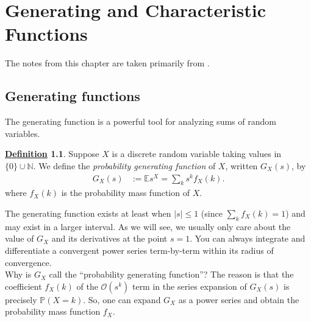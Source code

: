 \documentclass[12pt]{book}
\let\varepsilon\epsilon
\numberwithin{equation}{chapter}
\theoremstyle{plain}
\numberwithin{theorem}{section}
\theoremstyle{definition}
\newtheorem{definition}[theorem]{\underline{Definition}}
\numberwithin{exercise}{chapter}
\newcommand{\<}{\langle}
\renewcommand{\>}{\rangle}
\renewcommand{\(}{\left(}
\renewcommand{\)}{\right)}
\renewcommand{\[}{\left[}
\renewcommand{\]}{\right]}
\newcommand\Eb{\mathds{E}}
\newcommand\Pb{\mathds{P}}
\newcommand\Nb{\mathds{N}}
\newcommand\Oc{\mathscr{O}}
\newcommand\eps{\varepsilon}
\newcommand\dd{\mathrm{d}}
\begin{document}

%
%

\chapter{Generating and Characteristic Functions}
\label{chapter:generating}
The notes from this chapter are taken primarily from \cite[Chapter 5]{gs2001}.


\section{Generating functions}

The generating function is a powerful tool for analyzing sums of random variables.

\begin{definition}
Suppose $X$ is a discrete random variable taking values in $\{0\} \cup \Nb$.  We define the \emph{probability generating function} of $X$, written $G_X(s)$, by
\begin{align}
G_X(s)
	&:=	\Eb s^X 
	=		\sum_k s^k f_X(k) .
\end{align}
where $f_X(k)$ is the probability mass function of $X$.
\end{definition}

\noindent
The generating function exists at least when $|s|\leq1$ (since $\sum_k f_X(k)=1$) and may exist in a larger interval.  As we will see, we usually only care about the value of $G_X$ and its derivatives at the point $s=1$.  You can always integrate and differentiate a convergent power series term-by-term within its radius of convergence.
\\[0.5em]
Why is $G_X$ call the ``probability generating function''?  The reason is that the coefficient $f_X(k)$ of the $\Oc(s^k)$ term in the series expansion of $G_X(s)$ is precisely $\Pb( X= k )$.  So, one can expand $G_X$ as a power series and obtain the probability mass function $f_X$.
\end{document}
